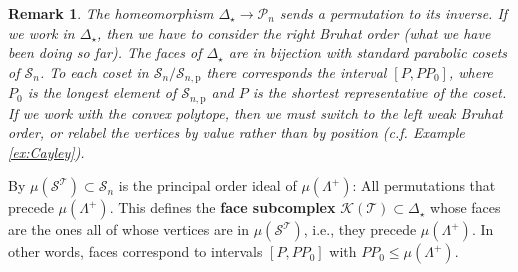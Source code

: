 \documentclass[reqno]{amsart}
\newcommand{\p}{\mathrm{p}}
\newcommand{\cS}{\mathcal{S}}
\newcommand{\cT}{\mathcal{T}}
\newtheorem{remark}[theorem]{Remark}
\begin{document}
 \begin{remark}The homeomorphism $\Delta_\star\to \mathcal{P}_n$ sends a permutation to its inverse. If we work in $\Delta_\star$, then  we have to consider the right Bruhat order (what we have been doing so far). The faces of  $\Delta_\star$
are in bijection with standard parabolic cosets of $\cS_{n}$. To each coset in $\cS_n/\cS_{n,\p}$ there corresponds the interval $[P,PP_0]$, where $P_0$ is the longest element of $\cS_{n,\p}$  and $P$ is the shortest representative of the coset.
If we work with the convex polytope, then we must switch to the left weak Bruhat order, or relabel the vertices by value rather than by position (c.f. Example \ref{ex:Cayley}).
\end{remark}

By \cite[Theorem 8]{BB} $\mu(\cS^{\cT})\subset \cS_{n}$ is the principal order ideal
of $\mu(\Lambda^+)$: All permutations that precede $\mu(\Lambda^+)$. This defines the {\bf face subcomplex} $\mathcal{K}(\cT)\subset \Delta_\star$ whose faces are the ones all of whose vertices are in $\mu(\cS^{\cT})$, i.e., they precede $\mu(\Lambda^+)$.
In other words, faces correspond to intervals $[P,PP_0]$ with $PP_0\leq \mu(\Lambda^+)$.
\end{document}
